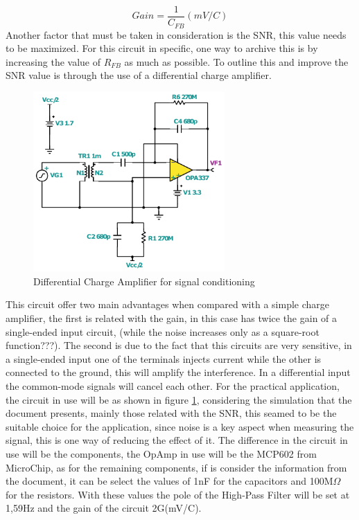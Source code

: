 \begin{equation}
    Gain = \frac{1}{C_{FB}} (mV/C)
\end{equation}
Another factor that must be taken in consideration is the SNR, this value needs to be maximized. For this circuit in specific, one way to archive this is by increasing the value of $R_{FB}$ as much as possible. To outline this and improve the SNR value is through the use of a differential charge amplifier.
\begin{figure}[!htb]
    \centering
    \includegraphics[width=0.65\textwidth]{Chapters/4CHP/Figures/differentialchargeamp.pdf}
    \caption{Differential Charge Amplifier for signal conditioning}
    \label{fig:ChargeAmpDif}
\end{figure}
This circuit offer two main advantages when compared with a simple charge amplifier, the first is related with the gain, in this case has twice the gain of a single-ended input circuit, (while the noise increases only as a square-root function???). The second is due to the fact that this circuits are very sensitive, in a single-ended input one of the terminals injects current while the other is connected to the ground, this will amplify the interference. In a differential input the common-mode signals will cancel each other. 
For the practical application, the  circuit in use will be as shown in figure \ref{fig:ChargeAmpDif}, considering the simulation that the document \cite{bartolomeSignalConditioningPiezoelectric2010} presents, mainly those related with the SNR, this seamed to be the suitable choice for the application, since noise is a key aspect when measuring the signal, this is one way of reducing the effect of it. The difference in the circuit in use will be the components, the OpAmp in use will be the MCP602 from MicroChip, as for the remaining components, if is consider the information from the document, it can be select the values of 1nF for the capacitors and 100M$\Omega$ for the resistors. With these values the pole of the High-Pass Filter will be set at 1,59Hz and the gain of the circuit 2G(mV/C).

